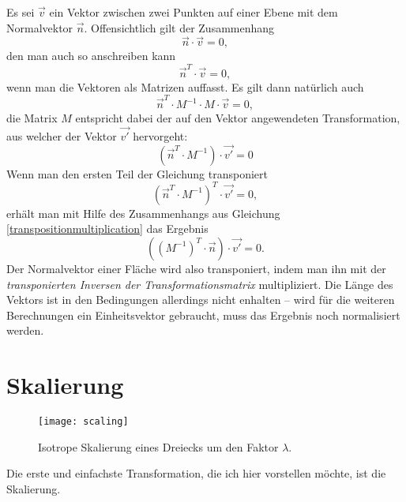 Es sei $\vec v$ ein Vektor zwischen zwei Punkten auf einer Ebene mit dem Normalvektor $\vec n$. Offensichtlich gilt der Zusammenhang
\begin{equation}
 \vec n \cdot \vec v = 0,
\end{equation}
den man auch so anschreiben kann
\begin{equation}
 \vec{n}^T \cdot \vec{v} = 0,
\end{equation}
wenn man die Vektoren als Matrizen auffasst.  Es gilt dann natürlich auch
\begin{equation}
 \vec{n}^T \cdot M^{-1} \cdot M \cdot \vec{v} = 0,
\end{equation}
die Matrix $M$ entspricht dabei der auf den Vektor angewendeten Transformation, aus welcher der Vektor $\vec{v'}$ hervorgeht:
\begin{equation}
 \left( \vec{n}^T \cdot M^{-1} \right) \cdot \vec{v'} = 0
\end{equation}
Wenn man den ersten Teil der Gleichung transponiert
\begin{equation}
 \left( \vec{n}^T \cdot M^{-1} \right)^T \cdot \vec{v'} = 0,
\end{equation}
erhält man mit Hilfe des Zusammenhangs aus Gleichung \ref{transpositionmultiplication} das Ergebnis
\begin{equation}
 \left( \left(M^{-1}\right)^T \cdot \vec{n} \right) \cdot \vec{v'} = 0.
\end{equation}
Der Normalvektor einer Fläche wird also transponiert, indem man ihn mit der \emph{transponierten Inversen der Transformationsmatrix} multipliziert. Die Länge des Vektors ist in den Bedingungen allerdings nicht enhalten -- wird für die weiteren Berechnungen ein Einheitsvektor gebraucht, muss das Ergebnis noch normalisiert werden.

\section{Skalierung}
\label{scaling}

\begin{wrapfigure}{r}{0.5\textwidth}
  \vspace{-10pt}
  \texttt{[image: scaling]}
  \vspace{-10pt}
  \caption{Isotrope Skalierung eines Dreiecks um den Faktor $\lambda$.}
\end{wrapfigure}

Die erste und einfachste Transformation, die ich hier vorstellen möchte, ist die Skalierung.

